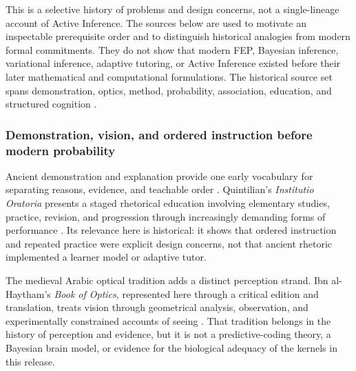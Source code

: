 \documentclass[
  english,
]{article}
\begin{document}
This is a selective history of problems and design concerns, not a
single-lineage account of Active Inference. The sources below are used
to motivate an inspectable prerequisite order and to distinguish
historical analogies from modern formal commitments. They do not show
that modern FEP, Bayesian inference, variational inference, adaptive
tutoring, or Active Inference existed before their later mathematical
and computational formulations. The historical source set spans
demonstration, optics, method, probability, association, education, and
structured cognition
\citep{aristotle_posterior_analytics, alhazen1989optics_direct_vision, quintilian95institutio_oratoria, bacon1620novum_organum, descartes1628rules_direction_mind, huygens1657ratiociniis, bernoulli1713ars_conjectandi, demoivre1718doctrine_chances, bayes1763doctrine_chances, laplace1774inverse_probability, newton1704opticks, berkeley1709new_theory_vision, locke1690essay, hume1739treatise, hume1748enquiry, hartley1749observations, condillac1754sensations, comenius1657great_didactic, locke1693education, rousseau1762emile, kant1781critique_pure_reason}.

\subsubsection{Demonstration, vision, and ordered instruction before
modern
probability}\label{demonstration-vision-and-ordered-instruction-before-modern-probability}

Ancient demonstration and explanation provide one early vocabulary for
separating reasons, evidence, and teachable order
\citep{aristotle_posterior_analytics}. Quintilian's \emph{Institutio
Oratoria} presents a staged rhetorical education involving elementary
studies, practice, revision, and progression through increasingly
demanding forms of performance \citep{quintilian95institutio_oratoria}.
Its relevance here is historical: it shows that ordered instruction and
repeated practice were explicit design concerns, not that ancient
rhetoric implemented a learner model or adaptive tutor.

The medieval Arabic optical tradition adds a distinct perception strand.
Ibn al-Haytham's \emph{Book of Optics}, represented here through a
critical edition and translation, treats vision through geometrical
analysis, observation, and experimentally constrained accounts of seeing
\citep{alhazen1989optics_direct_vision}. That tradition belongs in the
history of perception and evidence, but it is not a predictive-coding
theory, a Bayesian brain model, or evidence for the biological adequacy
of the kernels in this release.
\end{document}
